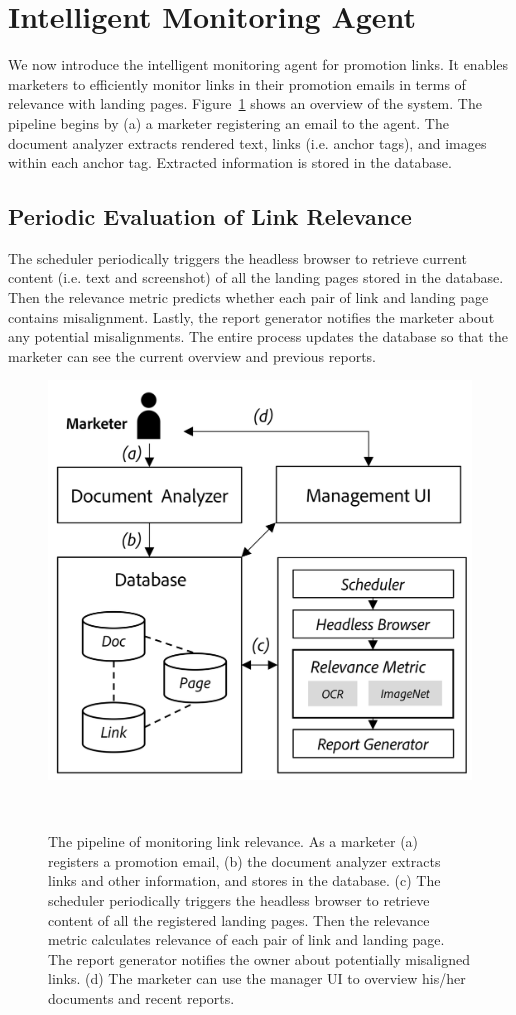 \documentclass{sigchi}
\begin{document}
\section{Intelligent Monitoring Agent}
We now introduce the intelligent monitoring agent for promotion links. It enables marketers to efficiently monitor links in their promotion emails in terms of relevance with landing pages. Figure~\ref{fig:pipeline} shows an overview of the system. The pipeline begins by (a) a marketer registering an email to the agent. The document analyzer extracts rendered text, links (i.e. anchor tags), and images within each anchor tag. Extracted information is stored in the database.

\subsection{Periodic Evaluation of Link Relevance}
The scheduler periodically triggers the headless browser to retrieve current content (i.e. text and screenshot) of all the landing pages stored in the database. Then the relevance metric predicts whether each pair of link and landing page contains misalignment. Lastly, the report generator notifies the marketer about any potential misalignments. The entire process updates the database so that the marketer can see the current overview and previous reports.  

\begin{figure}
\centering
  \includegraphics[width=0.8\columnwidth]{figures/pipeline}
  \caption{The pipeline of monitoring link relevance. As a marketer (a) registers a promotion email, (b) the document analyzer extracts links and other information, and stores in the database. (c) The scheduler periodically triggers the headless browser to retrieve content of all the registered landing pages. Then the relevance metric calculates relevance of each pair of link and landing page. The report generator notifies the owner about potentially misaligned links. (d) The marketer can use the manager UI to overview his/her documents and recent reports.}~\label{fig:pipeline}
\end{figure}
\end{document}
